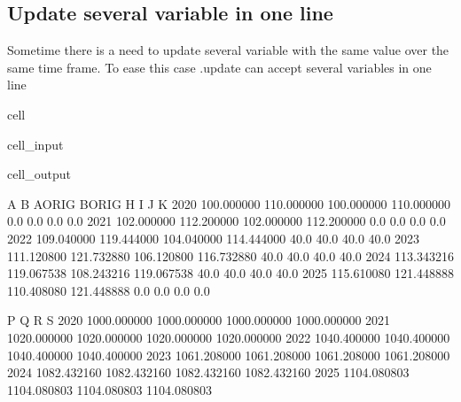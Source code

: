 \documentclass[letterpaper,10pt,english]{jupyterBook}
\begin{document}
\subsection{Update several variable in one line}
\label{\detokenize{content/04_PythonEssentials/UpdateCommand:update-several-variable-in-one-line}}
\sphinxAtStartPar
Sometime there is a need to update several variable with the same value over the same time frame. To ease this case .update can accept several variables in one line

\begin{sphinxuseclass}{cell}\begin{sphinxVerbatimInput}

\begin{sphinxuseclass}{cell_input}
\begin{sphinxVerbatim}[commandchars=\\\{\}]
\end{sphinxVerbatim}

\end{sphinxuseclass}\end{sphinxVerbatimInput}
\begin{sphinxVerbatimOutput}

\begin{sphinxuseclass}{cell_output}
\begin{sphinxVerbatim}[commandchars=\\\{\}]
               A           B      A\PYGZus{}ORIG      B\PYGZus{}ORIG     H     I     J     K  \PYGZbs{}
2020  100.000000  110.000000  100.000000  110.000000   0.0   0.0   0.0   0.0   
2021  102.000000  112.200000  102.000000  112.200000   0.0   0.0   0.0   0.0   
2022  109.040000  119.444000  104.040000  114.444000  40.0  40.0  40.0  40.0   
2023  111.120800  121.732880  106.120800  116.732880  40.0  40.0  40.0  40.0   
2024  113.343216  119.067538  108.243216  119.067538  40.0  40.0  40.0  40.0   
2025  115.610080  121.448888  110.408080  121.448888   0.0   0.0   0.0   0.0   

                P            Q            R            S  
2020  1000.000000  1000.000000  1000.000000  1000.000000  
2021  1020.000000  1020.000000  1020.000000  1020.000000  
2022  1040.400000  1040.400000  1040.400000  1040.400000  
2023  1061.208000  1061.208000  1061.208000  1061.208000  
2024  1082.432160  1082.432160  1082.432160  1082.432160  
2025  1104.080803  1104.080803  1104.080803  1104.080803  
\end{sphinxVerbatim}

\end{sphinxuseclass}\end{sphinxVerbatimOutput}

\end{sphinxuseclass}
\end{document}
